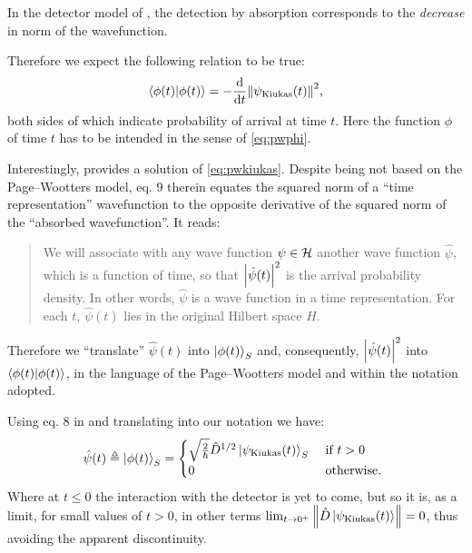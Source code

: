 In the detector model of \cite{RuschhauptAbsorption}, the detection
by absorption
corresponds to the \emph{decrease} in norm of the wavefunction.

Therefore we expect the following relation to be true:
\begin{equation}\label{eq:pwkiukas}
  \braket{\phi(t)} = -\dv{t}\norm{\psi_{\text{Kiukas}}(t)}^2 \text{,}
\end{equation}
both sides of which indicate probability of arrival at time $t$.
Here the function $\phi$ of time $t$ has to be intended in the sense of
\eqref{eq:pwphi}.

Interestingly, \cite{RuschhauptAbsorption} provides a solution of \eqref{eq:pwkiukas}.
Despite being not based on the Page--Wootters model, eq. 9 therein
equates the squared norm of a ``time representation'' wavefunction
to the opposite derivative of the squared norm of the ``absorbed wavefunction''.
It reads:
\begin{quote}
  We will associate with any wave function $\psi \in \mathcal{H}$
  another wave function $\hat{\psi}$,
  which is a function of time, so that
  $\abs{\hat{\psi}(t)}^2$
  is the arrival probability density. In other words,
  $\hat{\psi}$ is a wave function in a time representation. For each
  $t$, $\hat{\psi}(t)$ lies in the original Hilbert space $H$.
\end{quote}
Therefore we ``translate'' $\hat{\psi}(t)$ into $\ket{\phi(t)}_S$
and, consequently, $\abs{\hat{\psi}(t)}^2$ into $\braket{\phi(t)}$,
in the language of the Page--Wootters model and within the notation
adopted.

Using eq. 8 in \cite{RuschhauptAbsorption} and translating into our notation we have:
\begin{equation}\label{eq:phi_psi_kiukas}
  \hat{\psi}(t) \triangleq
  \ket{\phi(t)}_S =
  \begin{cases}
    \sqrt{\frac{2}{\hbar}} \hat{D}^{1/2} \ket{\psi_{\text{Kiukas}}(t)}_S &\text{ if } t > 0 \\
    0 &\text{ otherwise. }
  \end{cases}
\end{equation}
Where at $t \le 0$ the interaction with the detector is yet to come,
but so it is, as a limit, for small values of $t>0$,
in other terms
$\lim_{t \to 0^{+}} \norm{\hat{D} \ket{\psi_{\text{Kiukas}}(t)}} = 0$, thus avoiding the apparent discontinuity.


